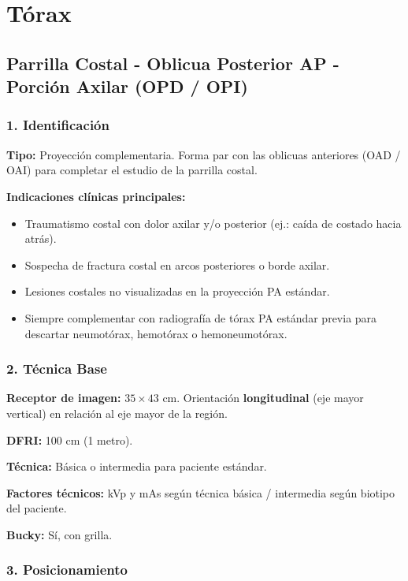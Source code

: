 	\section{Tórax}
	
	\subsection{Parrilla Costal - Oblicua Posterior AP - Porción Axilar (OPD / OPI)}
	
	\subsubsection*{1. Identificación}
	
	\textbf{Tipo:} Proyección complementaria. Forma par con las oblicuas anteriores (OAD / OAI) para completar el estudio de la parrilla costal.
	
	\textbf{Indicaciones clínicas principales:}
	\begin{itemize}
		\item Traumatismo costal con dolor axilar y/o posterior (ej.: caída de costado hacia atrás).
		\item Sospecha de fractura costal en arcos posteriores o borde axilar.
		\item Lesiones costales no visualizadas en la proyección PA estándar.
		\item Siempre complementar con radiografía de tórax PA estándar previa para descartar neumotórax, hemotórax o hemoneumotórax.
	\end{itemize}
	
	\subsubsection*{2. Técnica Base}
	
	\textbf{Receptor de imagen:} $35 \times 43$ cm. Orientación \textbf{longitudinal} (eje mayor vertical) en relación al eje mayor de la región.
	
	\textbf{DFRI:} 100 cm (1 metro).
	
	\textbf{Técnica:} Básica o intermedia para paciente estándar.
	
	\textbf{Factores técnicos:} kVp y mAs según técnica básica / intermedia según biotipo del paciente.
	
	\textbf{Bucky:} Sí, con grilla.
	
	\subsubsection*{3. Posicionamiento}
	
